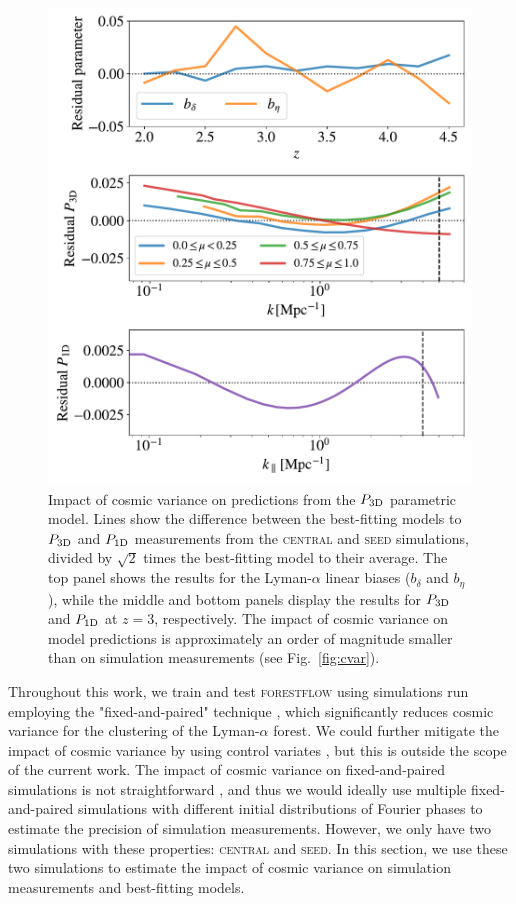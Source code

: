 \documentclass{aa}
\newcommand{\lya}{Lyman-$\alpha$\xspace}
\newcommand{\lyaf}{Lyman-$\alpha$ forest\xspace}
\newcommand{\poned}{\ensuremath{P_{\rm 1D}}\xspace}
\newcommand{\pthreed}{\ensuremath{P_{\rm 3D}}\xspace}
\newcommand{\forestflow}{\textsc{forestflow}\xspace}
\newcommand{\simseed}{\textsc{seed}\xspace}
\newcommand{\simcentral}{\textsc{central}\xspace}
\begin{document}
\begin{appendix}
\begin{figure}
\includegraphics[width=\columnwidth]{figures/cvar_fit_z_3.0.pdf}
\centering
\caption{Impact of cosmic variance on predictions from the \pthreed parametric model. Lines show the difference between the best-fitting models to \pthreed and \poned measurements from the \simcentral and \simseed simulations, divided by $\sqrt{2}$ times the best-fitting model to their average. The top panel shows the results for the \lya linear biases ($b_\delta$ and $b_\eta$), while the middle and bottom panels display the results for \pthreed and \poned at $z=3$, respectively. The impact of cosmic variance on model predictions is approximately an order of magnitude smaller than on simulation measurements (see Fig.~\ref{fig:cvar}).}
\label{fig:cvar_fit}
\end{figure}

Throughout this work, we train and test \forestflow using simulations run employing the "fixed-and-paired" technique \citep{angulo2016CosmologicalNbodySimulations, pontzen2016InvertedInitialConditions}, which significantly reduces cosmic variance for the clustering of the \lyaf \citep{anderson2019CosmologicalHydrodynamicSimulations}. We could further mitigate the impact of cosmic variance by using control variates \citep{Kokron2022}, but this is outside the scope of the current work. The impact of cosmic variance on fixed-and-paired simulations is not straightforward \citep{maion2022fpvariance}, and thus we would ideally use multiple fixed-and-paired simulations with different initial distributions of Fourier phases to estimate the precision of simulation measurements. However, we only have two simulations with these properties: \simcentral and \simseed. In this section, we use these two simulations to estimate the impact of cosmic variance on simulation measurements and best-fitting models.


\end{appendix}
\end{document}
